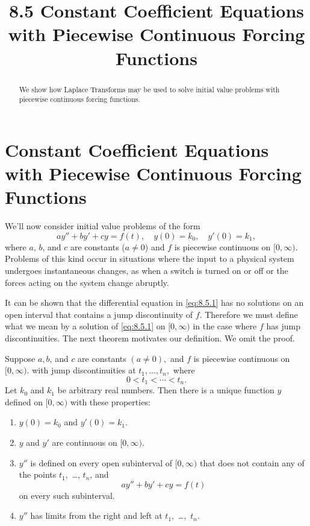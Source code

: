 \documentclass{ximera}
\title{8.5 Constant Coefficient Equations with Piecewise Continuous Forcing Functions}%
\begin{document}
\begin{abstract}
We show how Laplace Transforms may be used to solve initial value problems with piecewise continuous forcing functions.
\end{abstract}

\maketitle

\section*{Constant Coefficient Equations with Piecewise Continuous Forcing Functions}

We'll now consider initial value problems of the form
\begin{equation}\label{eq:8.5.1}
 ay''+by'+cy=f(t), \quad  y(0)=k_0,\quad y'(0)=k_1,
\end{equation}
where $a$, $b$, and $c$ are constants ($a\neq 0$) and $f$ is piecewise
continuous on $[0,\infty)$. Problems of this kind occur in situations
where the input to a physical system undergoes instantaneous changes,
as when a switch is turned on or off or the forces acting on the
system change abruptly.

It can be shown %
that the differential equation in \eqref{eq:8.5.1} has no solutions on
an open interval that contains a jump discontinuity of $f$. Therefore we
must define what we mean by a solution of \eqref{eq:8.5.1} on $[0,\infty)$
in the case where $f$ has jump discontinuities. The next theorem
motivates our definition. We omit the proof.

\begin{theorem}\label{thmtype:8.5.1}
Suppose $a,b$, and $c$ are constants $(a\neq 0),$ and $f$ is
piecewise  continuous on $[0,\infty).$ with jump discontinuities
at $t_1, \dots, t_n,$ where
$$
0<t_1<\cdots<t_n.
$$
 Let $k_0$ and $k_1$ be arbitrary real numbers. Then there
is a unique function $y$ defined on $[0,\infty)$ with these
properties:
\begin{enumerate}
\item %
 $y(0)=k_0$ and  $y'(0)=k_1$.
\item %
 $y$ and $y'$  are continuous on $[0,\infty)$.
\item %
$y''$ is defined
on every open subinterval of $[0,\infty)$ that does not contain any of the
points $t_1,$ \dots, $t_n$, and
$$
ay''+by'+cy=f(t)
$$
on every such subinterval.
\item %
$y''$ has limits from the right and left at $t_1,$ \dots$,$ $t_n$.
\end{enumerate}
\end{theorem}
\end{document}
